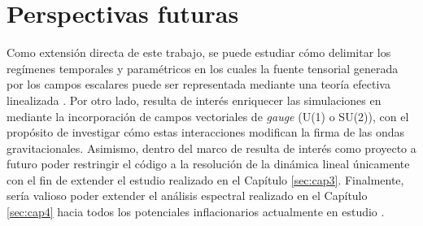 \section*{Perspectivas futuras}

Como extensión directa de este trabajo, se puede estudiar cómo delimitar los regímenes temporales y paramétricos en los cuales la fuente tensorial generada por los campos escalares puede ser representada mediante una teoría efectiva linealizada \cite{Elia_2026}. Por otro lado, resulta de interés enriquecer las simulaciones en \CosmoLattice mediante la incorporación de campos vectoriales de \textit{gauge} (U(1) o SU(2)), con el propósito de investigar cómo estas interacciones modifican la firma de las ondas gravitacionales. Asimismo, dentro del marco de \CosmoLattice resulta de interés como proyecto a futuro poder restringir el código a la resolución de la dinámica lineal únicamente con el fin de extender el estudio realizado en el Capítulo \ref{sec:cap3}. Finalmente, sería valioso poder extender el análisis espectral realizado en el Capítulo \ref{sec:cap4} hacia todos los potenciales inflacionarios actualmente en estudio \cite{Martin_2014}.